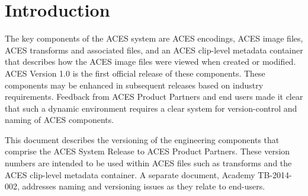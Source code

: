\unnumberedformat	    %
\chapter{Introduction} 	%

The key components of the ACES system are ACES encodings, ACES image files, ACES transforms and associated files, and an ACES clip-level metadata container that describes how the ACES image files were viewed when created or modified. ACES Version 1.0 is the first official release of these components. These components may be enhanced in subsequent releases based on industry requirements. Feedback from ACES Product Partners and end users made it clear that such a dynamic environment requires a clear system for version-control and naming of ACES components.


This document describes the versioning of the engineering components that comprise the ACES System Release to ACES Product Partners. These version numbers are intended to be used within ACES files such as transforms and the ACES clip-level metadata container. A separate document, Academy TB-2014-002, addresses naming and versioning issues as they relate to end-users.